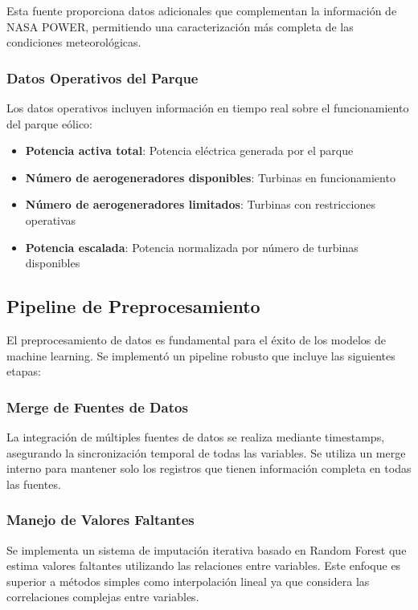 \documentclass[conference]{IEEEtran}
\begin{document}
	Esta fuente proporciona datos adicionales que complementan la información de NASA POWER, permitiendo una caracterización más completa de las condiciones meteorológicas.
	
	\subsubsection{Datos Operativos del Parque}
	Los datos operativos incluyen información en tiempo real sobre el funcionamiento del parque eólico:
	\begin{itemize}
		\item \textbf{Potencia activa total}: Potencia eléctrica generada por el parque
		\item \textbf{Número de aerogeneradores disponibles}: Turbinas en funcionamiento
		\item \textbf{Número de aerogeneradores limitados}: Turbinas con restricciones operativas
		\item \textbf{Potencia escalada}: Potencia normalizada por número de turbinas disponibles
	\end{itemize}
	
	\subsection{Pipeline de Preprocesamiento}
	El preprocesamiento de datos es fundamental para el éxito de los modelos de machine learning. Se implementó un pipeline robusto que incluye las siguientes etapas:
	
	\subsubsection{Merge de Fuentes de Datos}
	La integración de múltiples fuentes de datos se realiza mediante timestamps, asegurando la sincronización temporal de todas las variables. Se utiliza un merge interno para mantener solo los registros que tienen información completa en todas las fuentes.
	
	\subsubsection{Manejo de Valores Faltantes}
	Se implementa un sistema de imputación iterativa basado en Random Forest que estima valores faltantes utilizando las relaciones entre variables. Este enfoque es superior a métodos simples como interpolación lineal ya que considera las correlaciones complejas entre variables.
	
\end{document}
